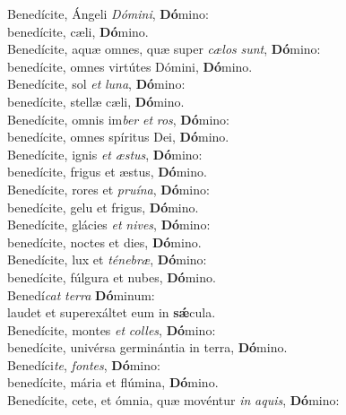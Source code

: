 \evenverse Benedícite, Ángeli \textit{Dó}\textit{mi}\textit{ni}, \textbf{Dó}mino:~\*\\
\evenverse benedícite, cæli, \textbf{Dó}mino.\\
\oddverse Benedícite, aquæ omnes, quæ super \textit{cæ}\textit{los} \textit{sunt}, \textbf{Dó}mino:~\*\\
\oddverse benedícite, omnes virtútes Dómini, \textbf{Dó}mino.\\
\evenverse Benedícite, sol \textit{et} \textit{lu}\textit{na}, \textbf{Dó}mino:~\*\\
\evenverse benedícite, stellæ cæli, \textbf{Dó}mino.\\
\oddverse Benedícite, omnis im\textit{ber} \textit{et} \textit{ros}, \textbf{Dó}mino:~\*\\
\oddverse benedícite, omnes spíritus Dei, \textbf{Dó}mino.\\
\evenverse Benedícite, ignis \textit{et} \textit{æ}\textit{stus}, \textbf{Dó}mino:~\*\\
\evenverse benedícite, frigus et æstus, \textbf{Dó}mino.\\
\oddverse Benedícite, rores et \textit{pru}\textit{í}\textit{na}, \textbf{Dó}mino:~\*\\
\oddverse benedícite, gelu et frigus, \textbf{Dó}mino.\\
\evenverse Benedícite, glácies \textit{et} \textit{ni}\textit{ves}, \textbf{Dó}mino:~\*\\
\evenverse benedícite, noctes et dies, \textbf{Dó}mino.\\
\oddverse Benedícite, lux et \textit{té}\textit{ne}\textit{bræ}, \textbf{Dó}mino:~\*\\
\oddverse benedícite, fúlgura et nubes, \textbf{Dó}mino.\\
\evenverse Benedí\textit{cat} \textit{ter}\textit{ra} \textbf{Dó}minum:~\*\\
\evenverse laudet et superexáltet eum in \textbf{sǽ}cula.\\
\oddverse Benedícite, montes \textit{et} \textit{col}\textit{les}, \textbf{Dó}mino:~\*\\
\oddverse benedícite, univérsa germinántia in terra, \textbf{Dó}mino.\\
\evenverse Benedíci\textit{te}, \textit{fon}\textit{tes}, \textbf{Dó}mino:~\*\\
\evenverse benedícite, mária et flúmina, \textbf{Dó}mino.\\
\oddverse Benedícite, cete, et ómnia, quæ movéntur \textit{in} \textit{a}\textit{quis}, \textbf{Dó}mino:~\*\\
